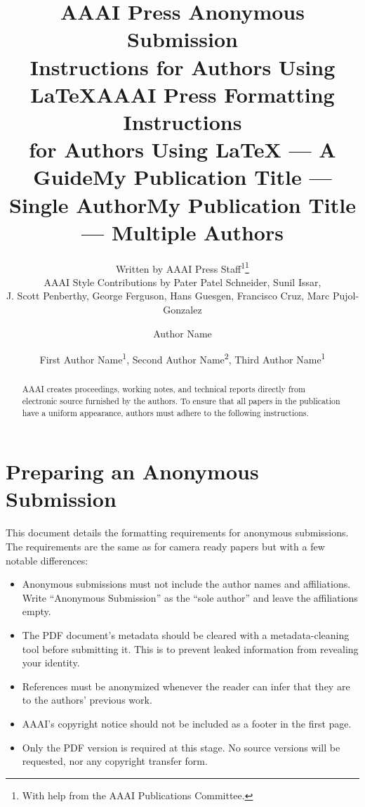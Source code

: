 \documentclass[letterpaper]{article} %
\title{AAAI Press Anonymous Submission\\Instructions for Authors Using \LaTeX{}}
\title{AAAI Press Formatting Instructions \\for Authors Using \LaTeX{} --- A Guide}
\author{
    Written by AAAI Press Staff\textsuperscript{\rm 1}\thanks{With help from the AAAI Publications Committee.}\\
    AAAI Style Contributions by Pater Patel Schneider,
    Sunil Issar,\\
    J. Scott Penberthy,
    George Ferguson,
    Hans Guesgen,
    Francisco Cruz\equalcontrib,
    Marc Pujol-Gonzalez\equalcontrib
}
\title{My Publication Title --- Single Author}
\author {
    Author Name
}
\title{My Publication Title --- Multiple Authors}
\author {
    First Author Name\textsuperscript{\rm 1},
    Second Author Name\textsuperscript{\rm 2},
    Third Author Name\textsuperscript{\rm 1}
}
\begin{document}
\maketitle

\begin{abstract}
AAAI creates proceedings, working notes, and technical reports directly from electronic source furnished by the authors. To ensure that all papers in the publication have a uniform appearance, authors must adhere to the following instructions.
\end{abstract}

\ifdefined\aaaianonymous
\else
\begin{links}
\end{links}
\fi

\ifdefined\aaaianonymous
\section{Preparing an Anonymous Submission}

This document details the formatting requirements for anonymous submissions. The requirements are the same as for camera ready papers but with a few notable differences:

\begin{itemize}
    \item Anonymous submissions must not include the author names and affiliations. Write ``Anonymous Submission'' as the ``sole author'' and leave the affiliations empty.
    \item The PDF document's metadata should be cleared with a metadata-cleaning tool before submitting it. This is to prevent leaked information from revealing your identity.
    \item References must be anonymized whenever the reader can infer that they are to the authors' previous work.
    \item AAAI's copyright notice should not be included as a footer in the first page.
    \item Only the PDF version is required at this stage. No source versions will be requested, nor any copyright transfer form.
\end{itemize}
\end{document}
